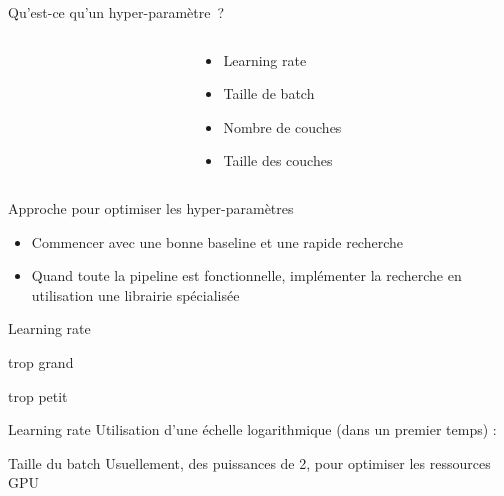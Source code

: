 \begin{frame}{Qu'est-ce qu'un hyper-paramètre~?}
  \begin{columns}
    \begin{column}[c]{0.5\textwidth}
    \end{column}
    \begin{column}[c]{0.5\textwidth}
      \begin{itemize}
        \item Learning rate
        \item Taille de batch
        \item Nombre de couches
        \item Taille des couches
      \end{itemize}
    \end{column}
  \end{columns}
\end{frame}

\begin{frame}{Approche pour optimiser les hyper-paramètres}
  \begin{itemize}[<+->]
    \item Commencer avec une bonne baseline et une rapide recherche 
    \item Quand toute la pipeline est fonctionnelle, implémenter la recherche en utilisation une librairie spécialisée
  \end{itemize}
\end{frame}

\begin{frame}{Learning rate}
  \begin{minipage}{0.49\textwidth}
    \centering
    trop grand
  \end{minipage}\hfill
  \begin{minipage}{0.49\linewidth}
    \centering
    trop petit
  \end{minipage}\hfill

\end{frame}

\begin{frame}{Learning rate}
  Utilisation d'une échelle logarithmique (dans un premier temps) :
\end{frame}

\begin{frame}{Taille du batch}
  Usuellement, des puissances de 2, pour optimiser les ressources GPU
\end{frame}

